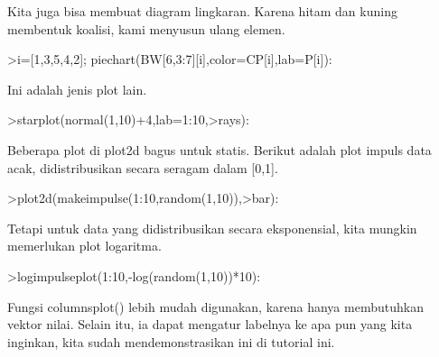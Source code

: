 \documentclass[a4paper,10pt]{article}
\begin{document}
\begin{eulernotebook}
\begin{eulercomment}
Kita juga bisa membuat diagram lingkaran. Karena hitam dan kuning
membentuk koalisi, kami menyusun ulang elemen.
\end{eulercomment}
\begin{eulerprompt}
>i=[1,3,5,4,2]; piechart(BW[6,3:7][i],color=CP[i],lab=P[i]):
\end{eulerprompt}
\begin{eulercomment}
Ini adalah jenis plot lain.
\end{eulercomment}
\begin{eulerprompt}
>starplot(normal(1,10)+4,lab=1:10,>rays):
\end{eulerprompt}
\begin{eulercomment}
Beberapa plot di plot2d bagus untuk statis. Berikut adalah plot impuls
data acak, didistribusikan secara seragam dalam [0,1].
\end{eulercomment}
\begin{eulerprompt}
>plot2d(makeimpulse(1:10,random(1,10)),>bar):
\end{eulerprompt}
\begin{eulercomment}
Tetapi untuk data yang didistribusikan secara eksponensial, kita
mungkin memerlukan plot logaritma.
\end{eulercomment}
\begin{eulerprompt}
>logimpulseplot(1:10,-log(random(1,10))*10):
\end{eulerprompt}
\begin{eulercomment}
Fungsi columnsplot() lebih mudah digunakan, karena hanya membutuhkan
vektor nilai. Selain itu, ia dapat mengatur labelnya ke apa pun yang
kita inginkan, kita sudah mendemonstrasikan ini di tutorial ini.


\end{eulercomment}
\end{eulernotebook}
\end{document}
